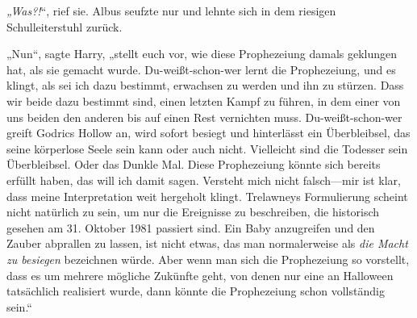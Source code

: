 \emph{„Was?!}“, rief sie. Albus seufzte nur und lehnte sich in dem riesigen Schulleiterstuhl zurück.

„Nun“, sagte Harry, „stellt euch vor, wie diese Prophezeiung damals geklungen hat, als sie gemacht wurde. Du-weißt-schon-wer lernt die Prophezeiung, und es klingt, als sei ich dazu bestimmt, erwachsen zu werden und ihn zu stürzen. Dass wir beide dazu bestimmt sind, einen letzten Kampf zu führen, in dem einer von uns beiden den anderen bis auf einen Rest vernichten muss. Du-weißt-schon-wer greift Godrics Hollow an, wird sofort besiegt und hinterlässt ein Überbleibsel, das seine körperlose Seele sein kann oder auch nicht. Vielleicht sind die Todesser sein Überbleibsel. Oder das Dunkle Mal. Diese Prophezeiung könnte sich bereits erfüllt haben, das will ich damit sagen. Versteht mich nicht falsch—mir ist klar, dass meine Interpretation weit hergeholt klingt. Trelawneys Formulierung scheint nicht natürlich zu sein, um nur die Ereignisse zu beschreiben, die historisch gesehen am 31. Oktober 1981 passiert sind. Ein Baby anzugreifen und den Zauber abprallen zu lassen, ist nicht etwas, das man normalerweise als \emph{die Macht zu besiegen} bezeichnen würde. Aber wenn man sich die Prophezeiung so vorstellt, dass es um mehrere mögliche Zukünfte geht, von denen nur eine an Halloween tatsächlich realisiert wurde, dann könnte die Prophezeiung schon vollständig sein.“


